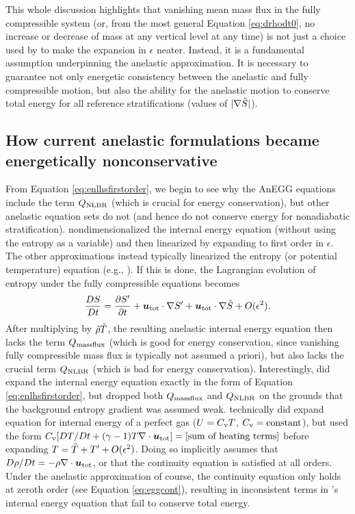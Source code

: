 \documentclass[12pt]{article}
\newcommand{\heatnlbr}{Q_{\rm NLBR}}
\newcommand{\heatmassflux}{Q_{\rm massflux}}
\newcommand{\utot}{{\vecu}_{\rm tot}}
\newcommand{\utotgrad}{\utot\dotgrad}
\begin{document}
This whole discussion highlights that vanishing mean mass flux in the fully compressible system (or, from the most general Equation \eqref{eq:drhodt0}, no increase or decrease of mass at any vertical level at any time) is not just a choice used by \citet{Gough1969} to make the expansion in $\epsilon$ neater. Instead, it is a fundamental assumption underpinning the anelastic approximation. It is necessary to guarantee not only energetic consistency between the anelastic and fully compressible motion, but also the ability for the anelastic motion to conserve total energy for all reference stratifications (values of $|\nabla\tilde{S}|$). 

\subsection{How current anelastic formulations became energetically nonconservative}
From Equation \eqref{eq:enlhsfirstorder}, we begin to see why the AnEGG equations include the term $\heatnlbr$ (which is crucial for energy conservation), but other anelastic equation sets do not (and hence do not conserve energy for nonadiabatic stratification). \citet{Gough1969} nondimensionalized the internal energy equation (without using the entropy as a variable) and then linearized by expanding to first order in $\epsilon$. The other approximations instead typically linearized the entropy (or potential temperature) equation (e.g., \citealt{Batchelor1953,Ogura1962,Lantz1999}). If this is done, the Lagrangian evolution of entropy under the fully compressible equations becomes
\begin{align}\label{eq:entrlhsfirstorder}
	\frac{DS}{Dt} =\pderiv{\entrprime}{t}  + \utotgrad \entrprime + \utotgrad \entrtilde + O(\epsilon^2).
\end{align}
After multiplying by $\tilde{\rho}\tilde{T}$, the resulting anelastic internal energy equation then lacks the term $\heatmassflux$ (which is good for energy conservation, since vanishing fully compressible mass flux is typically not assumed a priori), but also lacks the crucial term $\heatnlbr$ (which is bad for energy conservation). Interestingly, \citet{Gilman1981} did expand the internal energy equation exactly in the form of Equation \eqref{eq:enlhsfirstorder}, but dropped both $\heatmassflux$ and $\heatnlbr$ on the grounds that the background entropy gradient was assumed weak. \citet{Rogers2005} technically did expand equation for internal energy of a perfect gas ($U=C_{\rm{v}} T$, $C_{\rm{v}}=\text{constant}$), but used the form $\cvcap [DT/Dt + (\gamma-1)T\Div\utot]=\text{[sum of heating terms]}$ before expanding $T=\tilde{T}+{T^\prime} + O(\epsilon^2)$. Doing so implicitly assumes that $D\rho/Dt=-\rho\Div\utot$, or that the continuity equation is satisfied at all orders. Under the anelastic approximation of course, the continuity equation only holds at zeroth order (see Equation \eqref{eq:eggcont}), resulting in inconsistent terms in \citet{Rogers2005}'s internal energy equation that fail to conserve total energy. 
\end{document}
